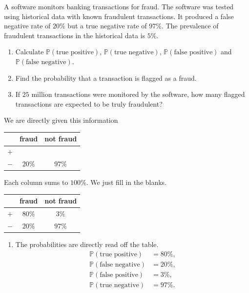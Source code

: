 \documentclass[../main.tex]{subfiles}
\begin{document}
\begin{exercise}
  A software monitors banking transactions for fraud. The software was tested using historical data with known fraudulent transactions. It produced a false negative rate of \(20\%\) but a true negative rate of \(97\%\). The prevalence of fraudulent transactions in the historical data is \(5\%\).
  
  \begin{enumerate}
    \item Calculate \(\mathbb{P}(\text{true positive})\), \(\mathbb{P}(\text{true negative})\), \(\mathbb{P}(\text{false positive})\) and \(\mathbb{P}(\text{false negative})\).
    \item Find the probability that a transaction is flagged as a fraud.
    \item If \(25\) million transactions were monitored by the software, how many flagged transactions are expected to be truly fraudulent?
  \end{enumerate}

  \begin{solution}
    We are directly given this information
    \begin{center}
      \begin{tabular}{l|c||c}
      & fraud & not fraud \\\midrule
        \(+\) &  & \\\midrule
        \(-\) & \(20\%\) & \(97\%\)
      \end{tabular}
    \end{center}

    Each column sums to \(100\%\). We just fill in the blanks.
    \begin{center}
      \begin{tabular}{l|c||c}
      & fraud & not fraud \\\midrule
        \(+\) & \(80\%\) & \(3\%\) \\\midrule
        \(-\) & \(20\%\) & \(97\%\)
      \end{tabular}
    \end{center} 

    \begin{enumerate}
      \item The probabilities are directly read off the table.
        \begin{align*}
          \mathbb{P}(\text{true positive}) &= 80\%, \\
          \mathbb{P}(\text{false negative}) &= 20\%, \\
          \mathbb{P}(\text{false positive}) &= 3\%, \\
          \mathbb{P}(\text{true negative}) &=  97\%.
        \end{align*}


\end{enumerate}
\end{solution}
\end{exercise}
\end{document}
